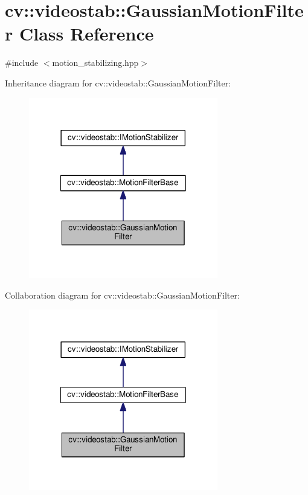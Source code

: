 \hypertarget{classcv_1_1videostab_1_1GaussianMotionFilter}{\section{cv\-:\-:videostab\-:\-:Gaussian\-Motion\-Filter Class Reference}
\label{classcv_1_1videostab_1_1GaussianMotionFilter}
}


{\ttfamily \#include $<$motion\-\_\-stabilizing.\-hpp$>$}



Inheritance diagram for cv\-:\-:videostab\-:\-:Gaussian\-Motion\-Filter\-:\nopagebreak
\begin{figure}[H]
\begin{center}
\leavevmode
\includegraphics[width=234pt]{classcv_1_1videostab_1_1GaussianMotionFilter__inherit__graph}
\end{center}
\end{figure}


Collaboration diagram for cv\-:\-:videostab\-:\-:Gaussian\-Motion\-Filter\-:\nopagebreak
\begin{figure}[H]
\begin{center}
\leavevmode
\includegraphics[width=234pt]{classcv_1_1videostab_1_1GaussianMotionFilter__coll__graph}
\end{center}
\end{figure}
